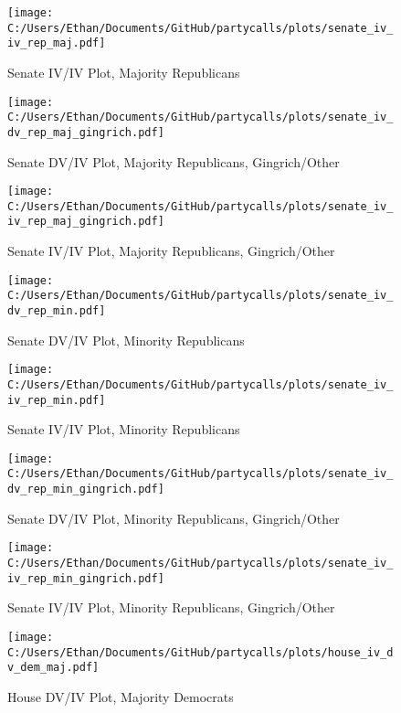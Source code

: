 \documentclass[12pt]{article}
\begin{document}
\begin{figure}[H]
	\centering
	\caption{Senate IV/IV Plot, Majority Republicans}
	\texttt{[image: C:/Users/Ethan/Documents/GitHub/partycalls/plots/senate\_iv\_iv\_rep\_maj.pdf]}
\end{figure}

\begin{figure}[H]
	\centering
	\caption{Senate DV/IV Plot, Majority Republicans, Gingrich/Other}
	\texttt{[image: C:/Users/Ethan/Documents/GitHub/partycalls/plots/senate\_iv\_dv\_rep\_maj\_gingrich.pdf]}
\end{figure}

\begin{figure}[H]
	\centering
	\caption{Senate IV/IV Plot, Majority Republicans, Gingrich/Other}
	\texttt{[image: C:/Users/Ethan/Documents/GitHub/partycalls/plots/senate\_iv\_iv\_rep\_maj\_gingrich.pdf]}
\end{figure}

\begin{figure}[H]
	\centering
	\caption{Senate DV/IV Plot, Minority Republicans}
	\texttt{[image: C:/Users/Ethan/Documents/GitHub/partycalls/plots/senate\_iv\_dv\_rep\_min.pdf]}
\end{figure}

\begin{figure}[H]
	\centering
	\caption{Senate IV/IV Plot, Minority Republicans}
	\texttt{[image: C:/Users/Ethan/Documents/GitHub/partycalls/plots/senate\_iv\_iv\_rep\_min.pdf]}
\end{figure}

\begin{figure}[H]
	\centering
	\caption{Senate DV/IV Plot, Minority Republicans, Gingrich/Other}
	\texttt{[image: C:/Users/Ethan/Documents/GitHub/partycalls/plots/senate\_iv\_dv\_rep\_min\_gingrich.pdf]}
\end{figure}

\begin{figure}[H]
	\centering
	\caption{Senate IV/IV Plot, Minority Republicans, Gingrich/Other}
	\texttt{[image: C:/Users/Ethan/Documents/GitHub/partycalls/plots/senate\_iv\_iv\_rep\_min\_gingrich.pdf]}
\end{figure}

\begin{figure}[H]
	\centering
	\caption{House DV/IV Plot, Majority Democrats}
	\texttt{[image: C:/Users/Ethan/Documents/GitHub/partycalls/plots/house\_iv\_dv\_dem\_maj.pdf]}
\end{figure}
\end{document}
